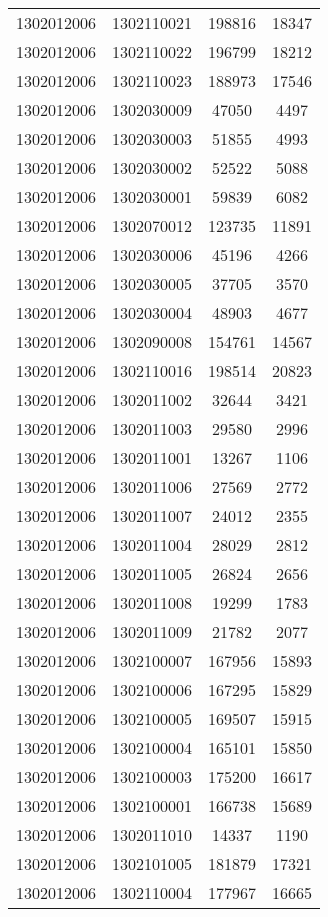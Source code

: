 \begin{longtable}[h]{llcc}
		1302012006 & 1302110021 & 198816 & 18347\\
		1302012006 & 1302110022 & 196799 & 18212\\
		1302012006 & 1302110023 & 188973 & 17546\\
		1302012006 & 1302030009 & 47050 & 4497\\
		1302012006 & 1302030003 & 51855 & 4993\\
		1302012006 & 1302030002 & 52522 & 5088\\
		1302012006 & 1302030001 & 59839 & 6082\\
		1302012006 & 1302070012 & 123735 & 11891\\
		1302012006 & 1302030006 & 45196 & 4266\\
		1302012006 & 1302030005 & 37705 & 3570\\
		1302012006 & 1302030004 & 48903 & 4677\\
		1302012006 & 1302090008 & 154761 & 14567\\
		1302012006 & 1302110016 & 198514 & 20823\\
		1302012006 & 1302011002 & 32644 & 3421\\
		1302012006 & 1302011003 & 29580 & 2996\\
		1302012006 & 1302011001 & 13267 & 1106\\
		1302012006 & 1302011006 & 27569 & 2772\\
		1302012006 & 1302011007 & 24012 & 2355\\
		1302012006 & 1302011004 & 28029 & 2812\\
		1302012006 & 1302011005 & 26824 & 2656\\
		1302012006 & 1302011008 & 19299 & 1783\\
		1302012006 & 1302011009 & 21782 & 2077\\
		1302012006 & 1302100007 & 167956 & 15893\\
		1302012006 & 1302100006 & 167295 & 15829\\
		1302012006 & 1302100005 & 169507 & 15915\\
		1302012006 & 1302100004 & 165101 & 15850\\
		1302012006 & 1302100003 & 175200 & 16617\\
		1302012006 & 1302100001 & 166738 & 15689\\
		1302012006 & 1302011010 & 14337 & 1190\\
		1302012006 & 1302101005 & 181879 & 17321\\
		1302012006 & 1302110004 & 177967 & 16665\\

\end{longtable}

